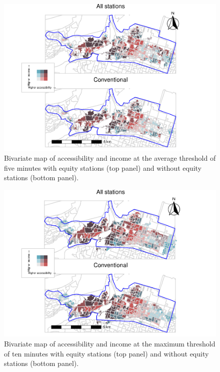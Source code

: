\documentclass[]{elsarticle} %
\begin{document}
\begin{figure}
\includegraphics[width=1.2\linewidth]{Bike-share-spatial-equity_files/figure-latex/figure-bi-map-threshold-5-1} \caption{\label{fig-bivariate-map-threshold-5}Bivariate map of accessibility and income at the average threshold of five minutes with equity stations (top panel) and without equity stations (bottom panel).}\label{fig:figure-bi-map-threshold-5}
\end{figure}

\begin{figure}
\includegraphics[width=1.2\linewidth]{Bike-share-spatial-equity_files/figure-latex/figure-bi-map-threshold-10-1} \caption{\label{fig-bivariate-map-threshold-10}Bivariate map of accessibility and income at the maximum threshold of ten minutes with equity stations (top panel) and without equity stations (bottom panel).}\label{fig:figure-bi-map-threshold-10}
\end{figure}
\end{document}
